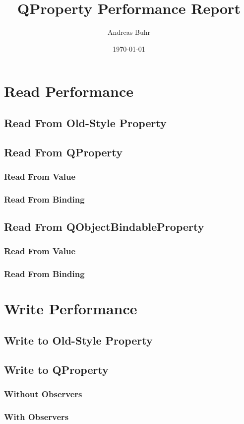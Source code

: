 \documentclass{article}
\title{QProperty Performance Report}
\author{Andreas Buhr}
\date{\today}
\begin{document}
\maketitle
\section{Read Performance}
\subsection{Read From Old-Style Property}
\subsection{Read From QProperty}
\subsubsection{Read From Value}
\subsubsection{Read From Binding}
\subsection{Read From QObjectBindableProperty}
\subsubsection{Read From Value}
\subsubsection{Read From Binding}
\section{Write Performance}
\subsection{Write to Old-Style Property}
\subsection{Write to QProperty}
\subsubsection{Without Observers}
\subsubsection{With Observers}
\end{document}
